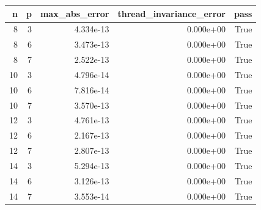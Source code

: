\begin{tabular}{rrrrr}
\toprule
n & p & max_abs_error & thread_invariance_error & pass \\
\midrule
8 & 3 & 4.334e-13 & 0.000e+00 & True \\
8 & 6 & 3.473e-13 & 0.000e+00 & True \\
8 & 7 & 2.522e-13 & 0.000e+00 & True \\
10 & 3 & 4.796e-14 & 0.000e+00 & True \\
10 & 6 & 7.816e-14 & 0.000e+00 & True \\
10 & 7 & 3.570e-13 & 0.000e+00 & True \\
12 & 3 & 4.761e-13 & 0.000e+00 & True \\
12 & 6 & 2.167e-13 & 0.000e+00 & True \\
12 & 7 & 2.807e-13 & 0.000e+00 & True \\
14 & 3 & 5.294e-13 & 0.000e+00 & True \\
14 & 6 & 3.126e-13 & 0.000e+00 & True \\
14 & 7 & 3.553e-14 & 0.000e+00 & True \\
\bottomrule
\end{tabular}
